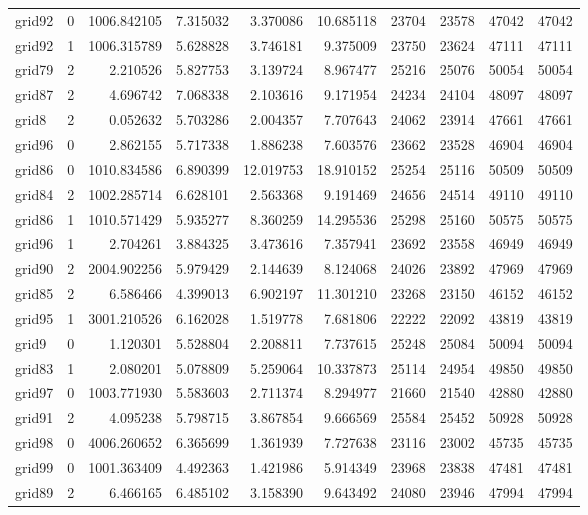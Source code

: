 \begin{longtable}{|l|r|r|r|r|r|r|r|r|r|}
grid92 & 0 & 1006.842105 & 7.315032 & 3.370086 & 10.685118 & 23704 & 23578 & 47042 & 47042 \\
grid92 & 1 & 1006.315789 & 5.628828 & 3.746181 & 9.375009 & 23750 & 23624 & 47111 & 47111 \\
grid79 & 2 & 2.210526 & 5.827753 & 3.139724 & 8.967477 & 25216 & 25076 & 50054 & 50054 \\
grid87 & 2 & 4.696742 & 7.068338 & 2.103616 & 9.171954 & 24234 & 24104 & 48097 & 48097 \\
grid8 & 2 & 0.052632 & 5.703286 & 2.004357 & 7.707643 & 24062 & 23914 & 47661 & 47661 \\
grid96 & 0 & 2.862155 & 5.717338 & 1.886238 & 7.603576 & 23662 & 23528 & 46904 & 46904 \\
grid86 & 0 & 1010.834586 & 6.890399 & 12.019753 & 18.910152 & 25254 & 25116 & 50509 & 50509 \\
grid84 & 2 & 1002.285714 & 6.628101 & 2.563368 & 9.191469 & 24656 & 24514 & 49110 & 49110 \\
grid86 & 1 & 1010.571429 & 5.935277 & 8.360259 & 14.295536 & 25298 & 25160 & 50575 & 50575 \\
grid96 & 1 & 2.704261 & 3.884325 & 3.473616 & 7.357941 & 23692 & 23558 & 46949 & 46949 \\
grid90 & 2 & 2004.902256 & 5.979429 & 2.144639 & 8.124068 & 24026 & 23892 & 47969 & 47969 \\
grid85 & 2 & 6.586466 & 4.399013 & 6.902197 & 11.301210 & 23268 & 23150 & 46152 & 46152 \\
grid95 & 1 & 3001.210526 & 6.162028 & 1.519778 & 7.681806 & 22222 & 22092 & 43819 & 43819 \\
grid9 & 0 & 1.120301 & 5.528804 & 2.208811 & 7.737615 & 25248 & 25084 & 50094 & 50094 \\
grid83 & 1 & 2.080201 & 5.078809 & 5.259064 & 10.337873 & 25114 & 24954 & 49850 & 49850 \\
grid97 & 0 & 1003.771930 & 5.583603 & 2.711374 & 8.294977 & 21660 & 21540 & 42880 & 42880 \\
grid91 & 2 & 4.095238 & 5.798715 & 3.867854 & 9.666569 & 25584 & 25452 & 50928 & 50928 \\
grid98 & 0 & 4006.260652 & 6.365699 & 1.361939 & 7.727638 & 23116 & 23002 & 45735 & 45735 \\
grid99 & 0 & 1001.363409 & 4.492363 & 1.421986 & 5.914349 & 23968 & 23838 & 47481 & 47481 \\
grid89 & 2 & 6.466165 & 6.485102 & 3.158390 & 9.643492 & 24080 & 23946 & 47994 & 47994 \\

\end{longtable}

